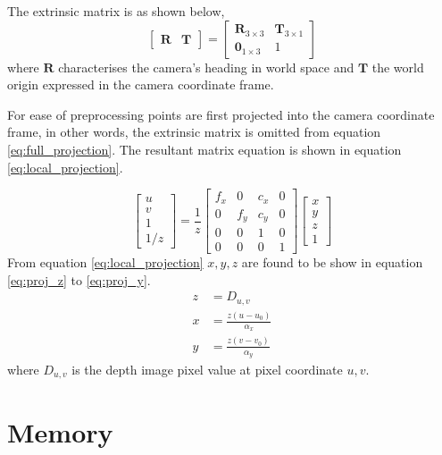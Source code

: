 The extrinsic matrix is as shown below,
\begin{equation}\label{eq:extrinsic}
    \begin{bmatrix}
        \boldsymbol{R} & \boldsymbol{T}
    \end{bmatrix}
    =
    \begin{bmatrix}
        \boldsymbol{R}_{3\times3} & \boldsymbol{T}_{3\times1} \\
        \boldsymbol{0}_{1\times3} & 1
    \end{bmatrix}
\end{equation}
where \(\boldsymbol{R}\) characterises the camera's heading in world space and \(\boldsymbol{T}\) the world origin expressed in 
the camera coordinate frame.

For ease of preprocessing points are first projected into the camera coordinate frame, in other words, the extrinsic matrix is omitted from equation \ref{eq:full_projection}.
The resultant matrix equation is shown in equation \ref{eq:local_projection}.

\begin{equation} \label{eq:local_projection}
    \begin{bmatrix}
        u \\
        v \\
        1 \\
        1/z
    \end{bmatrix}
    = \frac{1}{z}
    \begin{bmatrix}
        f_x & 0 & c_x & 0 \\
        0 & f_y & c_y & 0 \\
        0 & 0 & 1 & 0 \\
        0 & 0 & 0 & 1
    \end{bmatrix}
    \begin{bmatrix}
        x\\
        y\\
        z\\
        1
    \end{bmatrix}
\end{equation}
From equation \ref{eq:local_projection} \(x,y,z\) are found to be show in equation \ref{eq:proj_z} to \ref{eq:proj_y}.
\begin{align}
    z &= D_{u,v} \label{eq:proj_z}\\[0.2cm]
    x &= \frac{z(u - u_0)}{\alpha_x}\label{eq:proj_x} \\
    y &= \frac{z(v - v_0)}{\alpha_y}\label{eq:proj_y}
\end{align}
where \(D_{u,v}\) is the depth image pixel value at pixel coordinate \(u,v\).


\section{Memory}


